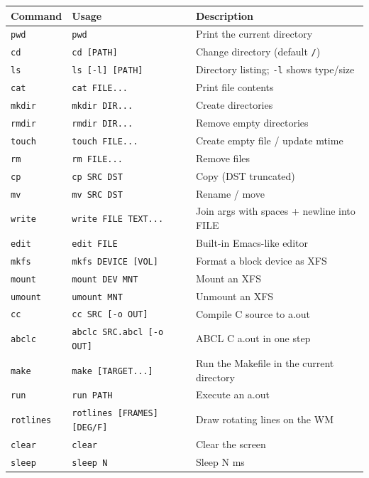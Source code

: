 \documentclass[a4paper,11pt]{article}
\begin{document}
\begin{center}\footnotesize
\begin{longtable}{@{}l l p{7.4cm}@{}}
\toprule
\textbf{Command} & \textbf{Usage} & \textbf{Description}\\
\midrule \endhead
\verb|pwd|   & \verb|pwd|              & Print the current directory\\
\verb|cd|    & \verb|cd [PATH]|        & Change directory (default \verb|/|)\\
\verb|ls|    & \verb|ls [-l] [PATH]|   & Directory listing; \verb|-l| shows type/size\\
\verb|cat|   & \verb|cat FILE...|      & Print file contents\\
\verb|mkdir| & \verb|mkdir DIR...|     & Create directories\\
\verb|rmdir| & \verb|rmdir DIR...|     & Remove empty directories\\
\verb|touch| & \verb|touch FILE...|    & Create empty file / update mtime\\
\verb|rm|    & \verb|rm FILE...|       & Remove files\\
\verb|cp|    & \verb|cp SRC DST|       & Copy (DST truncated)\\
\verb|mv|    & \verb|mv SRC DST|       & Rename / move\\
\verb|write| & \verb|write FILE TEXT...| & Join args with spaces + newline into FILE\\
\verb|edit|  & \verb|edit FILE|        & Built-in Emacs-like editor\\
\verb|mkfs|  & \verb|mkfs DEVICE [VOL]| & Format a block device as XFS\\
\verb|mount| & \verb|mount DEV MNT|    & Mount an XFS\\
\verb|umount|& \verb|umount MNT|       & Unmount an XFS\\
\verb|cc|    & \verb|cc SRC [-o OUT]|  & Compile C source to a.out\\
\verb|abclc| & \verb|abclc SRC.abcl [-o OUT]| & ABCL \textrightarrow{} C \textrightarrow{} a.out in one step\\
\verb|make|  & \verb|make [TARGET...]| & Run the Makefile in the current directory\\
\verb|run|   & \verb|run PATH|         & Execute an a.out\\
\verb|rotlines| & \verb|rotlines [FRAMES] [DEG/F]| & Draw rotating lines on the WM\\
\verb|clear| & \verb|clear|            & Clear the screen\\
\verb|sleep| & \verb|sleep N|          & Sleep N ms\\
\bottomrule
\end{longtable}
\end{center}
\end{document}
